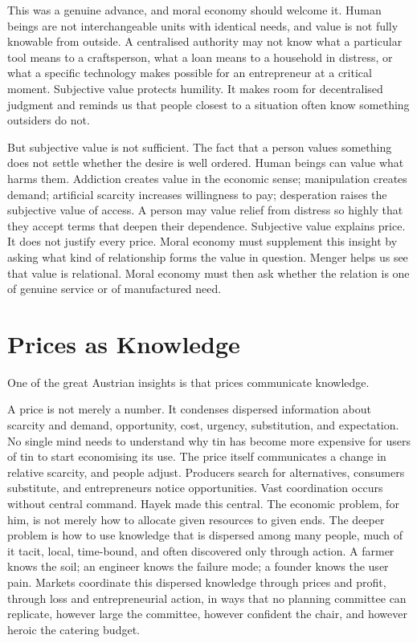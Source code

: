 \documentclass[11pt,a4paper,oneside]{book}
\begin{document}
This was a genuine advance, and moral economy should welcome it. Human beings are not interchangeable units with identical needs, and value is not fully knowable from outside. A centralised authority may not know what a particular tool means to a craftsperson, what a loan means to a household in distress, or what a specific technology makes possible for an entrepreneur at a critical moment. Subjective value protects humility. It makes room for decentralised judgment and reminds us that people closest to a situation often know something outsiders do not.

But subjective value is not sufficient. The fact that a person values something does not settle whether the desire is well ordered. Human beings can value what harms them. Addiction creates value in the economic sense; manipulation creates demand; artificial scarcity increases willingness to pay; desperation raises the subjective value of access. A person may value relief from distress so highly that they accept terms that deepen their dependence. Subjective value explains price. It does not justify every price. Moral economy must supplement this insight by asking what kind of relationship forms the value in question. Menger helps us see that value is relational. Moral economy must then ask whether the relation is one of genuine service or of manufactured need.

\section*{Prices as Knowledge}

One of the great Austrian insights is that prices communicate knowledge.

A price is not merely a number. It condenses dispersed information about scarcity and demand, opportunity, cost, urgency, substitution, and expectation. No single mind needs to understand why tin has become more expensive for users of tin to start economising its use. The price itself communicates a change in relative scarcity, and people adjust. Producers search for alternatives, consumers substitute, and entrepreneurs notice opportunities. Vast coordination occurs without central command. Hayek made this central. The economic problem, for him, is not merely how to allocate given resources to given ends. The deeper problem is how to use knowledge that is dispersed among many people, much of it tacit, local, time-bound, and often discovered only through action. A farmer knows the soil; an engineer knows the failure mode; a founder knows the user pain. Markets coordinate this dispersed knowledge through prices and profit, through loss and entrepreneurial action, in ways that no planning committee can replicate, however large the committee, however confident the chair, and however heroic the catering budget.
\end{document}
